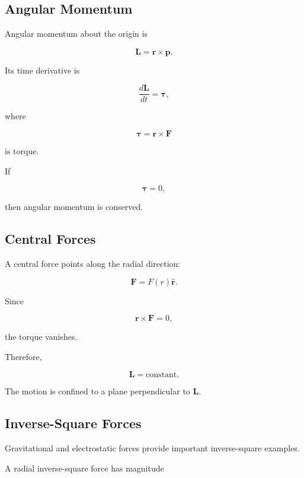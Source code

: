 \subsection{Angular Momentum}
\label{subsec:angular-momentum}

Angular momentum about the origin is

\[
\boxed{
\mathbf{L}
=
\mathbf{r}\times\mathbf{p}.
}
\]

Its time derivative is

\[
\boxed{
\frac{d\mathbf{L}}{dt}
=
\boldsymbol{\tau},
}
\]

where

\[
\boldsymbol{\tau}
=
\mathbf{r}\times\mathbf{F}
\]

is torque.

If

\[
\boldsymbol{\tau}=0,
\]

then angular momentum is conserved.

\subsection{Central Forces}
\label{subsec:central-forces}

A central force points along the radial direction:

\[
\boxed{
\mathbf{F}
=
F(r)\hat{\mathbf{r}}.
}
\]

Since

\[
\mathbf{r}\times\mathbf{F}=0,
\]

the torque vanishes.

Therefore,

\[
\boxed{
\mathbf{L}
=
\text{constant}.
}
\]

The motion is confined to a plane perpendicular to \(\mathbf{L}\).

\subsection{Inverse-Square Forces}
\label{subsec:inverse-square-forces}

Gravitational and electrostatic forces provide important inverse-square
examples.

A radial inverse-square force has magnitude

